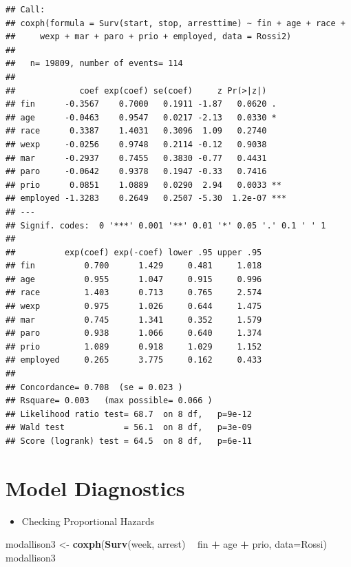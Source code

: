\documentclass[]{book}
\newenvironment{Shaded}{\begin{snugshade}}{\end{snugshade}}
\newcommand{\DataTypeTok}[1]{\textcolor[rgb]{0.13,0.29,0.53}{#1}}
\newcommand{\KeywordTok}[1]{\textcolor[rgb]{0.13,0.29,0.53}{\textbf{#1}}}
\newcommand{\NormalTok}[1]{#1}
\newcommand{\OperatorTok}[1]{\textcolor[rgb]{0.81,0.36,0.00}{\textbf{#1}}}
\newcommand{\StringTok}[1]{\textcolor[rgb]{0.31,0.60,0.02}{#1}}
\providecommand{\tightlist}{%
  \setlength{\itemsep}{0pt}\setlength{\parskip}{0pt}}
\begin{document}
\begin{verbatim}
## Call:
## coxph(formula = Surv(start, stop, arresttime) ~ fin + age + race + 
##     wexp + mar + paro + prio + employed, data = Rossi2)
## 
##   n= 19809, number of events= 114 
## 
##             coef exp(coef) se(coef)     z Pr(>|z|)    
## fin      -0.3567    0.7000   0.1911 -1.87   0.0620 .  
## age      -0.0463    0.9547   0.0217 -2.13   0.0330 *  
## race      0.3387    1.4031   0.3096  1.09   0.2740    
## wexp     -0.0256    0.9748   0.2114 -0.12   0.9038    
## mar      -0.2937    0.7455   0.3830 -0.77   0.4431    
## paro     -0.0642    0.9378   0.1947 -0.33   0.7416    
## prio      0.0851    1.0889   0.0290  2.94   0.0033 ** 
## employed -1.3283    0.2649   0.2507 -5.30  1.2e-07 ***
## ---
## Signif. codes:  0 '***' 0.001 '**' 0.01 '*' 0.05 '.' 0.1 ' ' 1
## 
##          exp(coef) exp(-coef) lower .95 upper .95
## fin          0.700      1.429     0.481     1.018
## age          0.955      1.047     0.915     0.996
## race         1.403      0.713     0.765     2.574
## wexp         0.975      1.026     0.644     1.475
## mar          0.745      1.341     0.352     1.579
## paro         0.938      1.066     0.640     1.374
## prio         1.089      0.918     1.029     1.152
## employed     0.265      3.775     0.162     0.433
## 
## Concordance= 0.708  (se = 0.023 )
## Rsquare= 0.003   (max possible= 0.066 )
## Likelihood ratio test= 68.7  on 8 df,   p=9e-12
## Wald test            = 56.1  on 8 df,   p=3e-09
## Score (logrank) test = 64.5  on 8 df,   p=6e-11
\end{verbatim}

\hypertarget{model-diagnostics}{%
\section{Model Diagnostics}\label{model-diagnostics}}

\begin{itemize}
\tightlist
\item
  Checking Proportional Hazards
\end{itemize}

\begin{Shaded}
\begin{Highlighting}[]
\NormalTok{modallison3 <-}\StringTok{ }\KeywordTok{coxph}\NormalTok{(}\KeywordTok{Surv}\NormalTok{(week, arrest) }\OperatorTok{~}\StringTok{ }\NormalTok{fin }\OperatorTok{+}\StringTok{ }\NormalTok{age }\OperatorTok{+}\StringTok{ }\NormalTok{prio, }\DataTypeTok{data=}\NormalTok{Rossi)}
\NormalTok{modallison3}
\end{Highlighting}
\end{Shaded}
\end{document}

